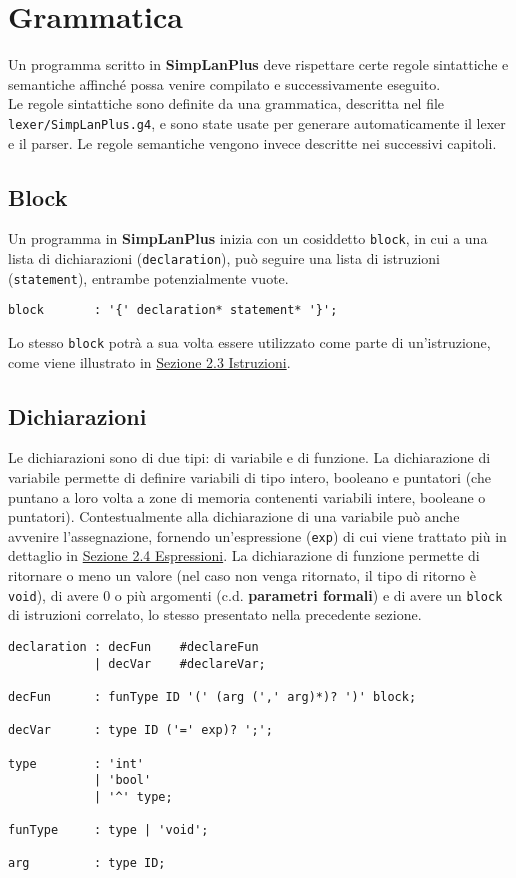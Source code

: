 \documentclass[../report.tex]{subfiles}
\begin{document}
\chapter{Grammatica}\label{c:grammatica}
Un programma scritto in \textbf{SimpLanPlus} deve rispettare certe regole sintattiche e semantiche affinché possa venire compilato e successivamente eseguito.\\
\noindent
Le regole sintattiche sono definite da una grammatica, descritta nel file \verb|lexer/SimpLanPlus.g4|, e sono state usate per generare automaticamente il lexer e il parser. Le regole semantiche vengono invece descritte nei successivi capitoli.

\section{Block}\label{s:block}
Un programma in \textbf{SimpLanPlus} inizia con un cosiddetto \verb|block|, in cui a una lista di dichiarazioni (\verb|declaration|), può seguire una lista di istruzioni (\verb|statement|), entrambe potenzialmente vuote.
\begin{lstlisting}[style=antlr]
block       : '{' declaration* statement* '}';
\end{lstlisting}
Lo stesso \verb|block| potrà a sua volta essere utilizzato come parte di un'istruzione, come viene illustrato in \hyperref[s:istruzioni]{Sezione 2.3 Istruzioni}.

\section{Dichiarazioni}\label{s:dichiarazioni}
Le dichiarazioni sono di due tipi: di variabile e di funzione. La dichiarazione di variabile permette di definire variabili di tipo intero, booleano e puntatori (che puntano a loro volta a zone di memoria contenenti variabili intere, booleane o puntatori). Contestualmente alla dichiarazione di una variabile può anche avvenire l'assegnazione, fornendo un'espressione (\verb|exp|) di cui viene trattato più in dettaglio in \hyperref[s:espressioni]{Sezione 2.4 Espressioni}.
La dichiarazione di funzione permette di ritornare o meno un valore (nel caso non venga ritornato, il tipo di ritorno è \verb|void|), di avere 0 o più argomenti (c.d. \textbf{parametri formali}) e di avere un \verb|block| di istruzioni correlato, lo stesso presentato nella precedente sezione.
\begin{lstlisting}[style=antlr]
declaration : decFun    #declareFun
            | decVar    #declareVar;

decFun      : funType ID '(' (arg (',' arg)*)? ')' block;

decVar      : type ID ('=' exp)? ';';

type        : 'int'
            | 'bool'
            | '^' type;

funType     : type | 'void';

arg         : type ID;
\end{lstlisting}
\end{document}
